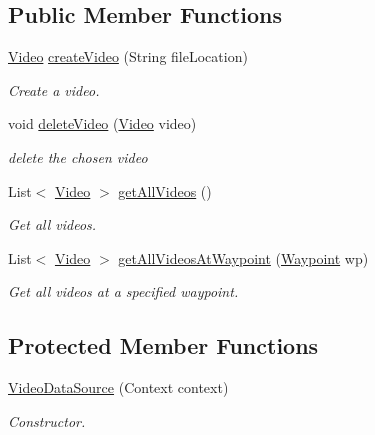 \subsection*{Public Member Functions}
\begin{DoxyCompactItemize}
\item 
\hyperlink{classuk_1_1ac_1_1swan_1_1digitaltrails_1_1components_1_1_video}{Video} \hyperlink{classuk_1_1ac_1_1swan_1_1digitaltrails_1_1database_1_1_video_data_source_ab76fb5bc9b8077fc94c252c6b32ba9ac}{create\+Video} (String file\+Location)
\begin{DoxyCompactList}\small\item\em Create a video. \end{DoxyCompactList}\item 
void \hyperlink{classuk_1_1ac_1_1swan_1_1digitaltrails_1_1database_1_1_video_data_source_adc434438cecf561102ababc4a4363d36}{delete\+Video} (\hyperlink{classuk_1_1ac_1_1swan_1_1digitaltrails_1_1components_1_1_video}{Video} video)
\begin{DoxyCompactList}\small\item\em delete the chosen video \end{DoxyCompactList}\item 
List$<$ \hyperlink{classuk_1_1ac_1_1swan_1_1digitaltrails_1_1components_1_1_video}{Video} $>$ \hyperlink{classuk_1_1ac_1_1swan_1_1digitaltrails_1_1database_1_1_video_data_source_a15bdc4035ed5280356768684b064a1f8}{get\+All\+Videos} ()
\begin{DoxyCompactList}\small\item\em Get all videos. \end{DoxyCompactList}\item 
List$<$ \hyperlink{classuk_1_1ac_1_1swan_1_1digitaltrails_1_1components_1_1_video}{Video} $>$ \hyperlink{classuk_1_1ac_1_1swan_1_1digitaltrails_1_1database_1_1_video_data_source_af47b90bb88ad3b66bcb099a74ac6c973}{get\+All\+Videos\+At\+Waypoint} (\hyperlink{classuk_1_1ac_1_1swan_1_1digitaltrails_1_1components_1_1_waypoint}{Waypoint} wp)
\begin{DoxyCompactList}\small\item\em Get all videos at a specified waypoint. \end{DoxyCompactList}\end{DoxyCompactItemize}
\subsection*{Protected Member Functions}
\begin{DoxyCompactItemize}
\item 
\hyperlink{classuk_1_1ac_1_1swan_1_1digitaltrails_1_1database_1_1_video_data_source_a29a99c61373776523ab47f3daf59bc33}{Video\+Data\+Source} (Context context)
\begin{DoxyCompactList}\small\item\em Constructor. \end{DoxyCompactList}\end{DoxyCompactItemize}
